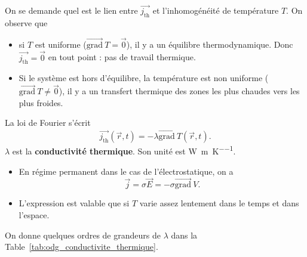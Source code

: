         On se demande quel est le lien entre $\vec{j_{\text{th}}}$ et l'inhomogénéité de température $T$. On observe que
        \begin{itemize}
            \item si $T$ est uniforme ($\overrightarrow{\text{grad}}~T=\vec{0}$), il y a un équilibre thermodynamique. Donc $\vec{j_{\text{th}}}=\vec{0}$ en tout point : pas de travail thermique.
            \item Si le système est hors d'équilibre, la température est non uniforme ($\overrightarrow{\text{grad}}~T\neq\vec{0}$), il y a un transfert thermique des zones les plus chaudes vers les plus froides.
        \end{itemize}

        La loi de Fourier s'écrit 
        \begin{equation}
            \boxed{
                \vec{j_{\text{th}}}(\vec{r},t)=-\lambda\overrightarrow{\text{grad}}~T(\vec{r},t).
            }
        \end{equation}
        $\lambda$ est la \textbf{conductivité thermique}. Son unité est \si{\watt\per\metre\per\kelvin}.

        \begin{remark}
            \begin{itemize}
                \item En régime permanent dans le cas de l'électrostatique, on a 
                \begin{equation}
                    \vec{j}=\sigma\vec{E}=-\sigma\overrightarrow{\text{grad}}~V.    
                \end{equation}
                \item L'expression est valable que si $T$ varie assez lentement dans le temps et dans l'espace.
            \end{itemize}
        \end{remark}

        On donne quelques ordres de grandeurs de $\lambda$ dans la Table~\ref{tab:odg_conductivite_thermique}.

